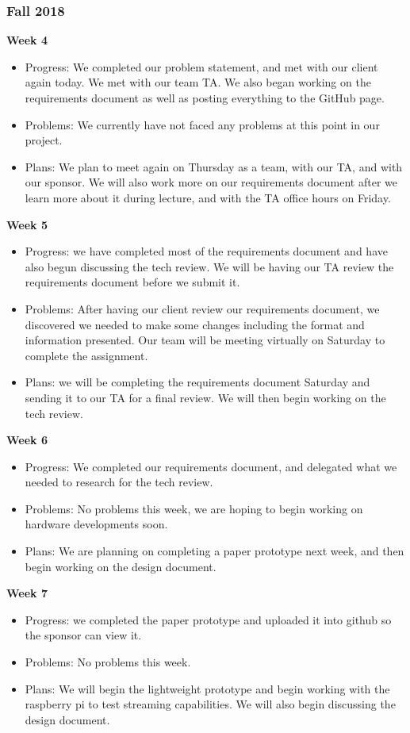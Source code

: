 \subsubsection{Fall 2018}
\textbf{Week 4}
\begin{itemize}
    \item Progress: We completed our problem statement, and met with our client again today. We met with our team TA. We also began working on the requirements document as well as posting everything to the GitHub page.
    \item Problems: We currently have not faced any problems at this point in our project.
    \item Plans: We plan to meet again on Thursday as a team, with our TA, and with our sponsor. We will also work more on our requirements document after we learn more about it during lecture, and with the TA office hours on Friday. 
\end{itemize}
\textbf{Week 5}
\begin{itemize}
    \item Progress: we have completed most of the requirements document and have also begun discussing the tech review. We will be having our TA review the requirements document before we submit it.
    \item Problems: After having our client review our requirements document, we discovered we needed to make some changes including the format and information presented. Our team will be meeting virtually on Saturday to complete the assignment.
    \item Plans: we will be completing the requirements document Saturday and sending it to our TA for a final review. We will then begin working on the tech review.
\end{itemize}
\textbf{Week 6}
\begin{itemize}
    \item Progress: We completed our requirements document, and delegated what we needed to research for the tech review.
    \item Problems: No problems this week, we are hoping to begin working on hardware developments soon.
    \item Plans: We are planning on completing a paper prototype next week, and then begin working on the design document.
\end{itemize}
\textbf{Week 7}
\begin{itemize}
    \item Progress: we completed the paper prototype and uploaded it into github so the sponsor can view it.
    \item Problems: No problems this week.
    \item Plans: We will begin the lightweight prototype and begin working with the raspberry pi to test streaming capabilities. We will also begin discussing the design document.
\end{itemize}
